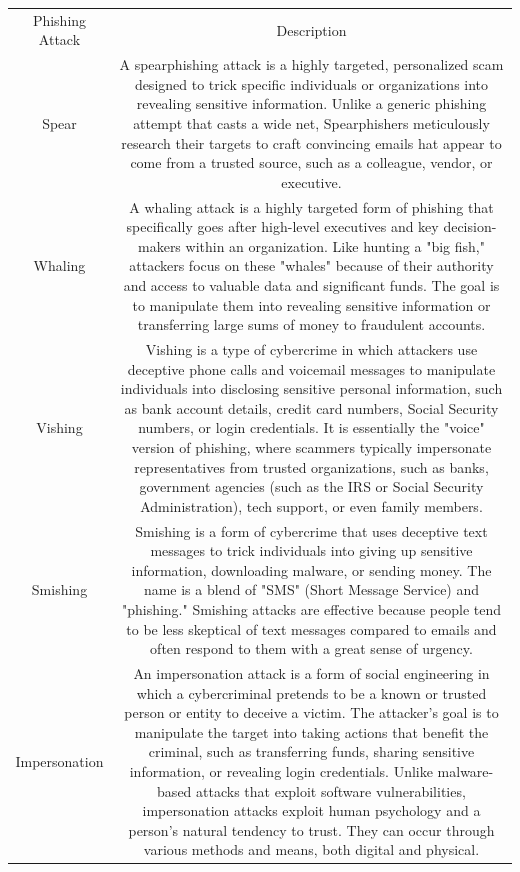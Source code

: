 \begin{table}
    \centering
    \begin{tabular}{cc}
         Phishing Attack& Description\\
         Spear& A spearphishing attack is a highly targeted, personalized scam designed to trick specific individuals or organizations into revealing sensitive information. Unlike a generic phishing attempt that casts a wide net, Spearphishers meticulously research their targets to craft convincing emails hat appear to come from a trusted source, such as a colleague, vendor, or executive.\\
         Whaling& A whaling attack is a highly targeted form of phishing that specifically goes after high-level executives and key decision-makers within an organization. Like hunting a "big fish," attackers focus on these "whales" because of their authority and access to valuable data and significant funds. The goal is to manipulate them into revealing sensitive information or transferring large sums of money to fraudulent accounts.\\
         Vishing& Vishing is a type of cybercrime in which attackers use deceptive phone calls and voicemail messages to manipulate individuals into disclosing sensitive personal information, such as bank account details, credit card numbers, Social Security numbers, or login credentials. It is essentially the "voice" version of phishing, where scammers typically impersonate representatives from trusted organizations, such as banks, government agencies (such as the IRS or Social Security Administration), tech support, or even family members.\\
         Smishing& Smishing is a form of cybercrime that uses deceptive text messages to trick individuals into giving up sensitive information, downloading malware, or sending money. The name is a blend of "SMS" (Short Message Service) and "phishing." Smishing attacks are effective because people tend to be less skeptical of text messages compared to emails and often respond to them with a great sense of urgency.\\
         Impersonation& An impersonation attack is a form of social engineering in which a cybercriminal pretends to be a known or trusted person or entity to deceive a victim. The attacker's goal is to manipulate the target into taking actions that benefit the criminal, such as transferring funds, sharing sensitive information, or revealing login credentials. Unlike malware-based attacks that exploit software vulnerabilities, impersonation attacks exploit human psychology and a person's natural tendency to trust. They can occur through various methods and means, both digital and physical.\\

\end{tabular}
\end{table}
